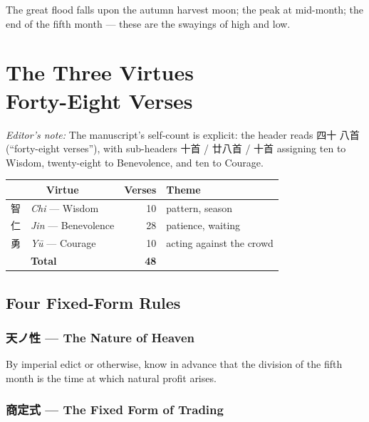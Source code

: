 \documentclass[10pt, openany]{book}
\newcommand{\jp}[1]{{\japanesefont #1}}
\newenvironment{editorialnote}{%
  \begin{editorbox}\small\textit{Editor's note:}\enspace}{\end{editorbox}}
\begin{document}
The great flood falls upon the autumn harvest moon; the peak at
mid-month; the end of the fifth month --- these are the swayings
of high and low.

\chapter{The Three Virtues\\Forty-Eight Verses}

\begin{editorialnote}
The manuscript's self-count is explicit: the header reads \jp{四十
八首} (``forty-eight verses''), with sub-headers \jp{十首} /
\jp{廿八首} / \jp{十首} assigning ten to Wisdom, twenty-eight to
Benevolence, and ten to Courage.
\end{editorialnote}

\begin{center}\small
\begin{tabular}{@{}c l r l@{}}
\toprule
\multicolumn{2}{c}{\textbf{Virtue}} & \textbf{Verses} & \textbf{Theme}\\
\midrule
\jp{智} & \textit{Chi} --- Wisdom       & 10 & pattern, season\\
\jp{仁} & \textit{Jin} --- Benevolence  & 28 & patience, waiting\\
\jp{勇} & \textit{Y\=u} --- Courage     & 10 & acting against the crowd\\
\midrule
        & \textbf{Total}                & \textbf{48} & \\
\bottomrule
\end{tabular}
\end{center}

\section{Four Fixed-Form Rules}

\subsection*{\jp{天ノ性} --- The Nature of Heaven}

By imperial edict or otherwise, know in advance that the division
of the fifth month is the time at which natural profit arises.

\subsection*{\jp{商定式} --- The Fixed Form of Trading}
\end{document}
